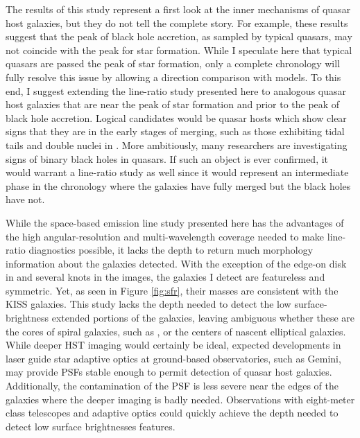 The results of this study represent a first look at the inner mechanisms of quasar host galaxies, but they do not tell the complete story.  For example, these results suggest that the peak of black hole accretion, as sampled by typical quasars, may not coincide with the peak for star formation.  While I speculate here that typical quasars are passed the peak of star formation, only a complete chronology will fully resolve this issue by allowing a direction comparison with models.  To this end, I suggest extending the line-ratio study presented here to analogous quasar host galaxies that are near the peak of star formation and prior to the peak of black hole accretion.  Logical candidates would be quasar hosts which show clear signs that they are in the early stages of merging, such as those exhibiting tidal tails and double nuclei in \cite{Bahcall}.  More ambitiously, many researchers are investigating signs of binary black holes in quasars.  If such an object is ever confirmed, it would warrant a line-ratio study as well since it would represent an intermediate phase in the chronology where the galaxies have fully merged but the black holes have not.

While the space-based emission line study presented here has the advantages of the high angular-resolution and multi-wavelength coverage needed to make line-ratio diagnostics possible, it lacks the depth to return much morphology information about the galaxies detected.  With the exception of the edge-on disk in  and several knots in the  images, the galaxies I detect are featureless and symmetric.  Yet, as seen in Figure \ref{fig:sfr}, their masses are consistent with the KISS galaxies. This study lacks the depth needed to detect the low surface-brightness extended portions of the galaxies, leaving ambiguous whether these are the cores of spiral galaxies, such as , or the centers of nascent elliptical galaxies. While deeper HST imaging would certainly be ideal, expected developments in laser guide star adaptive optics at ground-based observatories, such as Gemini, may provide PSFs stable enough to permit detection of quasar host galaxies.  Additionally, the contamination of the PSF is less severe near the edges of the galaxies where the deeper imaging is badly needed.  Observations with eight-meter class telescopes and adaptive optics could quickly achieve the depth needed to detect low surface brightnesses features.

